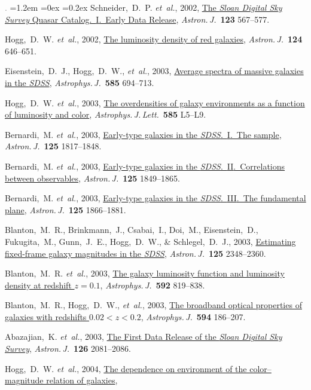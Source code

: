 \documentclass[10pt,letterpaper]{article}
\newcommand{\acronym}[1]{{\small{#1}}}
\newcommand{\foreign}[1]{\textsl{#1}}
\newcommand{\etal}{\foreign{et~al.}}
\newcommand{\project}[1]{\textsl{#1}}
\newcommand{\doi}[2]{\href{http://dx.doi.org/#1}{{#2}}}
\newcommand{\deemph}[1]{\textcolor{grey}{\footnotesize{#1}}}
\newcommand{\pubnumber}[1]{\deemph{{#1}.}}
\newcounter{refpubnum}
\newcommand{\hogglist}{%
    \rightmargin=0in
    \leftmargin=1.2em
    \topsep=0ex
    \partopsep=0pt
    \itemsep=0.2ex
    \parsep=0pt
    \itemindent=-1.0\leftmargin
    \listparindent=0.0\leftmargin
    \settowidth{\labelsep}{~}
    \usecounter{refpubnum}
  }
\begin{document}
\begin{list}{\pubnumber{\therefpubnum}}{\hogglist}
Schneider,~D.~P. \etal, 2002,
\doi{10.1086/338434}{The \project{Sloan Digital Sky Survey} Quasar Catalog.\ \acronym{I}.\ Early Data Release},
\textit{Astron.\,J.}\ \textbf{123} 567--577.
\item
Hogg,~D.~W. \etal, 2002,
\doi{10.1086/341392}{The luminosity density of red galaxies},
\textit{Astron.\,J.}\ \textbf{124} 646--651.
\item
Eisenstein,~D.~J., Hogg,~D.~W., \etal, 2003,
\doi{10.1086/346233}{Average spectra of massive galaxies in the \project{\acronym{SDSS}}},
\textit{Astrophys.\,J.}\ \textbf{585} 694--713.
\item
Hogg,~D.~W. \etal, 2003,
\doi{10.1086/374238}{The overdensities of galaxy environments as a function of luminosity and color},
\textit{Astrophys.\,J.\,Lett.}\
\textbf{585} L5--L9.
\item
Bernardi,~M. \etal, 2003,
\doi{10.1086/367776}{Early-type galaxies in the \project{\acronym{SDSS}}.\ \acronym{I}.\ The sample},
\textit{Astron.\,J.}\ \textbf{125} 1817--1848.
\item
Bernardi,~M. \etal, 2003,
\doi{10.1086/374256}{Early-type galaxies in the \project{\acronym{SDSS}}.\ \acronym{II}.\ Correlations between observables},
\textit{Astron.\,J.}\ \textbf{125} 1849--1865.
\item
Bernardi,~M. \etal, 2003,
\doi{10.1086/367794}{Early-type galaxies in the \project{\acronym{SDSS}}.\ \acronym{III}.\ The fundamental plane},
\textit{Astron.\,J.}\ \textbf{125} 1866--1881.
\item
Blanton,~M.~R., Brinkmann,~J., Csabai,~I., Doi,~M., Eisenstein,~D., Fukugita,~M., Gunn,~J.~E., Hogg,~D.~W., \& Schlegel,~D.~J., 2003,
\doi{10.1086/342935}{Estimating fixed-frame galaxy magnitudes in the \project{\acronym{SDSS}}},
\textit{Astron.\,J.}\ \textbf{125} 2348--2360.
\item
Blanton,~M.~R. \etal, 2003,
\doi{10.1086/375776}{The galaxy luminosity function and luminosity density at redshift $z=0.1$},
\textit{Astrophys.\,J.}\ \textbf{592} 819--838.
\item
Blanton,~M.~R., Hogg,~D.~W., \etal, 2003,
\doi{10.1086/375528}{The broadband optical properties of galaxies with redshifts $0.02<z<0.2$},
\textit{Astrophys.\,J.}\ \textbf{594} 186--207.
\item
Abazajian,~K. \etal, 2003,
\doi{10.1086/378165}{The First Data Release of the \project{Sloan Digital Sky Survey}},
\textit{Astron.\,J.}\ \textbf{126} 2081--2086.
\item\label{pub:Hogg2004}
Hogg,~D.~W. \etal, 2004,
\doi{10.1086/381749}{The dependence on environment of the color--magnitude relation of galaxies},

\end{list}
\end{document}
